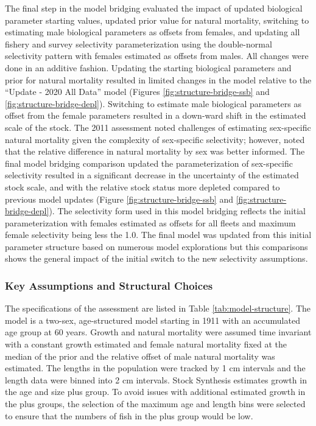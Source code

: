 \documentclass[11pt,
  english,
  a4paper,
]{article}
\begin{document}
The final step in the model bridging evaluated the impact of updated biological parameter starting values, updated prior value for natural mortality, switching to estimating male biological parameters as offsets from females, and updating all fishery and survey selectivity parameterization using the double-normal selectivity pattern with females estimated as offsets from males. All changes were done in an additive fashion. Updating the starting biological parameters and prior for natural mortality resulted in limited changes in the model relative to the ``Update - 2020 All Data'' model (Figures \ref{fig:structure-bridge-ssb} and \ref{fig:structure-bridge-depl}). Switching to estimate male biological parameters as offset from the female parameters resulted in a down-ward shift in the estimated scale of the stock. The 2011 assessment noted challenges of estimating sex-specific natural mortality given the complexity of sex-specific selectivity; however, noted that the relative difference in natural mortality by sex was better informed. The final model bridging comparison updated the parameterization of sex-specific selectivity resulted in a significant decrease in the uncertainty of the estimated stock scale, and with the relative stock status more depleted compared to previous model updates (Figure \ref{fig:structure-bridge-ssb} and \ref{fig:structure-bridge-depl}). The selectivity form used in this model bridging reflects the initial parameterization with females estimated as offsets for all fleets and maximum female selectivity being less the 1.0. The final model was updated from this initial parameter structure based on numerous model explorations but this comparisons shows the general impact of the initial switch to the new selectivity assumptions.

\leavevmode\tagmcend\tagstructend\par


\hypertarget{key-assumptions-and-structural-choices}{%
\subsubsection{Key Assumptions and Structural Choices}\label{key-assumptions-and-structural-choices}}

\leavevmode\tagmcend\tagstructend


The specifications of the assessment are listed in Table \ref{tab:model-structure}. The model is a two-sex, age-structured model starting in 1911 with an accumulated age group at 60 years. Growth and natural mortality were assumed time invariant with a constant growth estimated and female natural mortality fixed at the median of the prior and the relative offset of male natural mortality was estimated. The lengths in the population were tracked by 1 cm intervals and the length data were binned into 2 cm intervals. Stock Synthesis estimates growth in the age and size plus group. To avoid issues with additional estimated growth in the plus groups, the selection of the maximum age and length bins were selected to ensure that the numbers of fish in the plus group would be low.
\end{document}
